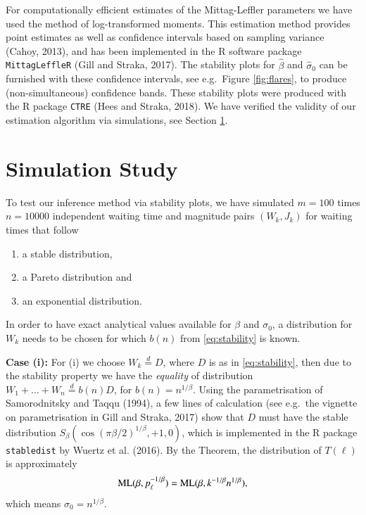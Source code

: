 \documentclass[]{elsarticle} %
\begin{document}
For computationally efficient estimates of the Mittag-Leffler parameters
we have used the method of log-transformed moments. This estimation
method provides point estimates as well as confidence intervals based on
sampling variance (Cahoy, 2013), and has been implemented in the R
software package \texttt{MittagLeffleR} (Gill and Straka, 2017). The
stability plots for \(\hat \beta\) and \(\hat \sigma_0\) can be
furnished with these confidence intervals, see e.g.~Figure
\ref{fig:flares}, to produce (non-simultaneous) confidence bands. These
stability plots were produced with the R package \texttt{CTRE} (Hees and
Straka, 2018). We have verified the validity of our estimation algorithm
via simulations, see Section \ref{Simulationstudy}.

\hypertarget{Simulationstudy}{%
\section{Simulation Study}\label{Simulationstudy}}

To test our inference method via stability plots, we have simulated
\(m=100\) times \(n=10000\) independent waiting time and magnitude pairs
\((W_k, J_k)\) for waiting times that follow

\begin{enumerate}
\def\labelenumi{(\roman{enumi})}
\item
  a stable distribution,
\item
  a Pareto distribution and
\item
  an exponential distribution.
\end{enumerate}

In order to have exact analytical values available for \(\beta\) and
\(\sigma_0\), a distribution for \(W_k\) needs to be chosen for which
\(b(n)\) from \eqref{eq:stability} is known.

\textbf{Case (i):} For (i) we choose \(W_k \stackrel{d}{=} D\), where
\(D\) is as in \eqref{eq:stability}, then due to the stability property
we have the \emph{equality} of distribution
\(W_1 + \ldots + W_n \stackrel{d}{=} b(n) D\), for
\(b(n) = n^{1/\beta}\). Using the parametrisation of Samorodnitsky and
Taqqu (1994), a few lines of calculation (see e.g.~the vignette on
parametrisation in Gill and Straka, 2017) show that \(D\) must have the
stable distribution \(S_\beta(\cos(\pi \beta/2)^{1/\beta}, +1, 0)\),
which is implemented in the R package \texttt{stabledist} by Wuertz et
al. (2016). By the Theorem, the distribution of \(T(\ell)\) is
approximately \[
{\rm ML}(\beta, p_{\ell}^{-1/\beta}) 
= {\rm ML}(\beta, k^{-1/\beta} n^{1/\beta}),
\] which means \(\sigma_0 = n^{1/\beta}\).
\end{document}
